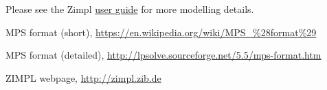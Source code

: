\documentclass[11pt,listof=totoc]{scrartcl}
\theoremstyle{definition}
\begin{document}
Please see the Zimpl
\href{http://zimpl.zib.de/download/zimpl.pdf}{user guide} for more
modelling details.

\begin{thebibliography}{}
 MPS format (short),
  \url{https://en.wikipedia.org/wiki/MPS_%28format%29}

 MPS format (detailed),
  \url{http://lpsolve.sourceforge.net/5.5/mps-format.htm}

 ZIMPL webpage,
  \url{http://zimpl.zib.de}
\end{thebibliography}
\end{document}
